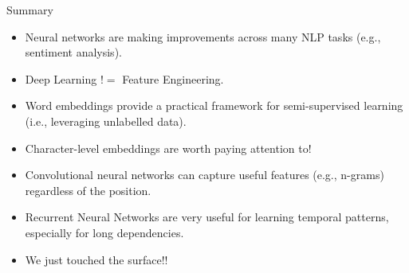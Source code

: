 \documentclass[handout]{beamer}
\begin{document}
\begin{frame}{Summary}
\begin{scriptsize}
\begin{itemize}
\item Neural networks are making improvements across many NLP tasks (e.g., sentiment analysis).
\item Deep Learning $!=$ Feature Engineering.
\item Word embeddings provide a practical framework for semi-supervised learning (i.e., leveraging unlabelled data).
\item Character-level embeddings are worth paying attention to!
\item Convolutional neural networks can capture useful features (e.g., n-grams) regardless of the position.
\item Recurrent Neural Networks are very useful for learning temporal patterns, especially for long dependencies.
\item We just touched the surface!!
\end{itemize}
\end{scriptsize}


\end{frame}
\end{document}
